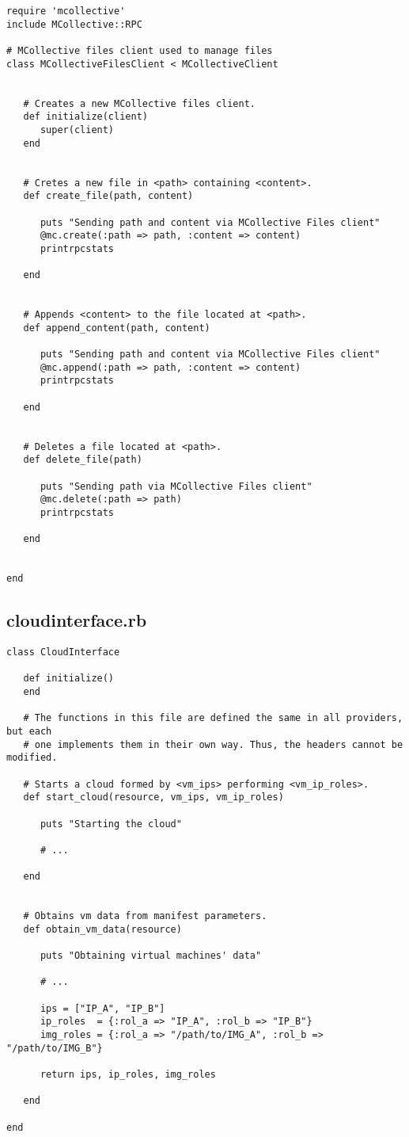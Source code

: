 \begin{lstlisting}
require 'mcollective'
include MCollective::RPC

# MCollective files client used to manage files
class MCollectiveFilesClient < MCollectiveClient
   
   
   # Creates a new MCollective files client.
   def initialize(client)
      super(client)
   end
   
   
   # Cretes a new file in <path> containing <content>.
   def create_file(path, content)
   
      puts "Sending path and content via MCollective Files client"
      @mc.create(:path => path, :content => content)
      printrpcstats
   
   end
   
   
   # Appends <content> to the file located at <path>.
   def append_content(path, content)
   
      puts "Sending path and content via MCollective Files client"
      @mc.append(:path => path, :content => content)
      printrpcstats
   
   end
   
   
   # Deletes a file located at <path>.
   def delete_file(path)
   
      puts "Sending path via MCollective Files client"
      @mc.delete(:path => path)
      printrpcstats
   
   end
   
   
end
\end{lstlisting}


\subsection{cloudinterface.rb}


\begin{lstlisting}
class CloudInterface

   def initialize()
   end

   # The functions in this file are defined the same in all providers, but each
   # one implements them in their own way. Thus, the headers cannot be modified.

   # Starts a cloud formed by <vm_ips> performing <vm_ip_roles>.
   def start_cloud(resource, vm_ips, vm_ip_roles)

      puts "Starting the cloud"
      
      # ...

   end


   # Obtains vm data from manifest parameters.
   def obtain_vm_data(resource)

      puts "Obtaining virtual machines' data"
      
      # ...
      
      ips = ["IP_A", "IP_B"]
      ip_roles  = {:rol_a => "IP_A", :rol_b => "IP_B"}
      img_roles = {:rol_a => "/path/to/IMG_A", :rol_b => "/path/to/IMG_B"}
      
      return ips, ip_roles, img_roles
      
   end
   
end
\end{lstlisting}


